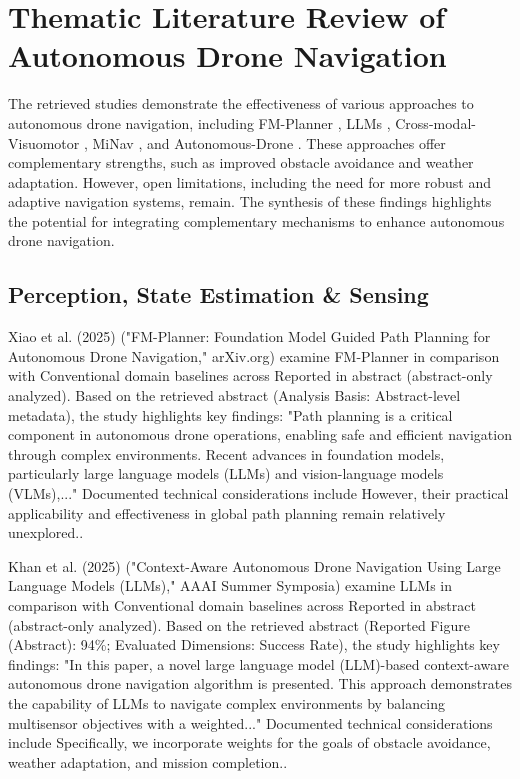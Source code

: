\documentclass[10pt,twocolumn,letterpaper]{article}
\begin{document}
\section{Thematic Literature Review of Autonomous Drone Navigation}
The retrieved studies demonstrate the effectiveness of various approaches to autonomous drone navigation, including FM-Planner \cite{ref1}, LLMs \cite{ref2}, Cross-modal-Visuomotor \cite{ref3}, MiNav \cite{ref4}, and Autonomous-Drone \cite{ref5}. These approaches offer complementary strengths, such as improved obstacle avoidance and weather adaptation. However, open limitations, including the need for more robust and adaptive navigation systems, remain. The synthesis of these findings highlights the potential for integrating complementary mechanisms to enhance autonomous drone navigation.

\subsection{Perception, State Estimation \& Sensing}
Xiao et al. (2025) \cite{ref1} ("FM-Planner: Foundation Model Guided Path Planning for Autonomous Drone Navigation," arXiv.org) examine FM-Planner in comparison with Conventional domain baselines across Reported in abstract (abstract-only analyzed). Based on the retrieved abstract (Analysis Basis: Abstract-level metadata), the study highlights key findings: "Path planning is a critical component in autonomous drone operations, enabling safe and efficient navigation through complex environments. Recent advances in foundation models, particularly large language models (LLMs) and vision-language models (VLMs),..." Documented technical considerations include However, their practical applicability and effectiveness in global path planning remain relatively unexplored..

Khan et al. (2025) \cite{ref2} ("Context-Aware Autonomous Drone Navigation Using Large Language Models (LLMs)," AAAI Summer Symposia) examine LLMs in comparison with Conventional domain baselines across Reported in abstract (abstract-only analyzed). Based on the retrieved abstract (Reported Figure (Abstract): 94\%; Evaluated Dimensions: Success Rate), the study highlights key findings: "In this paper, a novel large language model (LLM)-based context-aware autonomous drone navigation algorithm is presented. This approach demonstrates the capability of LLMs to navigate complex environments by balancing multisensor objectives with a weighted..." Documented technical considerations include Specifically, we incorporate weights for the goals of obstacle avoidance, weather adaptation, and mission completion..
\end{document}
